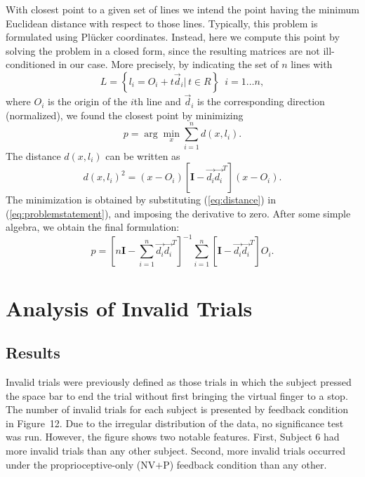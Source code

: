 \documentclass[prodmode,acmtap]{acmlarge}
\begin{document}
With closest point to a given set of lines we intend the point
having the minimum Euclidean distance with respect to those lines.
Typically, this problem is formulated using Pl\"{u}cker coordinates.
Instead, here we compute this point by solving the problem in a closed
form, since the resulting matrices are not ill-conditioned in our
case. More precisely, by indicating the set of $n$ lines with
%
\begin{equation}
  L = \left \{ l_i = O_i + t \vec{d}_i | \, t \in {R} \right \} \,\,\, i = 1
  \ldots n,
  \label{eq:setoflines}
\end{equation}
%
where $O_i$ is the origin of the $i$th line and $\vec{d}_i$ is the
corresponding direction (normalized), we found the closest point by
minimizing
%
\begin{equation}
  p = \arg \min_{x} \sum_{i=1}^{n} d(x,l_i).
  \label{eq:problemstatement}
\end{equation}
%
The distance $d(x, l_i)$ can be written as
%
\begin{equation}
  d(x , l_i)^2 = (x - O_i) \left [ \textbf{I} - \vec{d_i} \vec{d_i}^T \right ] (x - O_i).
  \label{eq:distance}
\end{equation}
%
The minimization is obtained by substituting (\ref{eq:distance}) in
(\ref{eq:problemstatement}), and imposing the derivative to zero.
%
After some simple algebra, we obtain the final formulation:
%
\begin{equation}
  p = \left [ n \textbf{I} - \sum_{i=1}^{n} \vec{d_i} \vec{d_i}^T
  \right ]^{-1} \sum_{i=1}^{n} \left [ \textbf{I} - \vec{d_i} \vec{d_i}^T \right ] O_i.
  \label{eq:closedform}
\end{equation}





\elecappendix


\section{Analysis of Invalid Trials}
\label{invalid}

\subsection{Results}


Invalid trials were previously defined as those trials in which the
subject pressed the space bar to end the trial without first bringing
the virtual finger to a stop. The number of invalid trials for each
subject is presented by feedback condition in Figure~12. Due to the
irregular distribution of the data, no significance test was run.
However, the figure shows two notable features. First, Subject 6 had
more invalid trials than any other subject. Second, more invalid
trials occurred under the proprioceptive-only (NV$+$P) feedback
condition than any other.
\end{document}
